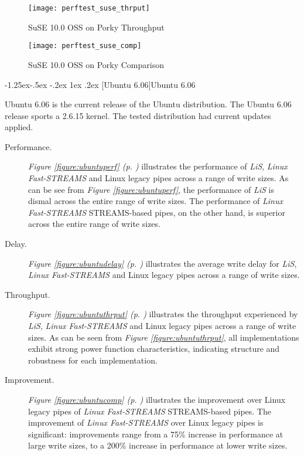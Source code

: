 \documentclass[letterpaper,final,notitlepage,twocolumn,10pt,twoside]{article}
\makeatletter
\let\normalsize\small
\let\small\footnotesize
\let\footnotesize\scriptsize
\let\scriptsize\tiny
\renewcommand\subsubsection{\@startsection{subsubsection}{3}{\z@}%
                                     {-1.25ex\@plus -.5ex \@minus -.2ex}%
                                     {1ex \@plus .2ex}%
                                     {\normalfont\normalsize\bfseries}}
\makeatother
\begin{document}
\begin{figure}[p]
\texttt{[image: perftest\_suse\_thrput]}
\caption[SuSE 10.0 OSS on Porky Throughput]{SuSE 10.0 OSS on Porky Throughput}
\label{figure:susethrput}
\end{figure}

\begin{figure}[p]
\texttt{[image: perftest\_suse\_comp]}
\caption[SuSE 10.0 OSS on Porky Comparison]{SuSE 10.0 OSS on Porky Comparison}
\label{figure:susecomp}
\end{figure}

\subsubsection[Ubuntu 6.06]{Ubuntu 6.06}

Ubuntu 6.06 is the current release of the Ubuntu distribution.  The Ubuntu
6.06 release sports a 2.6.15 kernel.  The tested distribution had current
updates applied.

\begin{description}

\item[Performance.]

\textit{Figure \ref{figure:ubuntuperf} (p. \pageref{figure:ubuntuperf})}
illustrates the performance of \textsl{LiS}, \textsl{Linux Fast-STREAMS} and
Linux legacy pipes across a range of write sizes.  As can be see from
\textit{Figure \ref{figure:ubuntuperf}}, the performance of \textsl{LiS} is
dismal across the entire range of write sizes.  The performance of
\textsl{Linux Fast-STREAMS} STREAMS-based pipes, on the other hand, is
superior across the entire range of write sizes.

\item[Delay.]

\textit{Figure \ref{figure:ubuntudelay} (p. \pageref{figure:ubuntudelay})}
illustrates the average write delay for \textsl{LiS}, \textsl{Linux
Fast-STREAMS} and Linux legacy pipes across a range of write sizes.

\item[Throughput.]

\textit{Figure \ref{figure:ubuntuthrput} (p.  \pageref{figure:ubuntuthrput})}
illustrates the throughput experienced by \textsl{LiS}, \textsl{Linux
Fast-STREAMS} and Linux legacy pipes across a range of write sizes.  As can be
seen from \textit{Figure \ref{figure:ubuntuthrput}}, all implementations
exhibit strong power function characteristics, indicating structure and
robustness for each implementation.

\item[Improvement.]

\textit{Figure \ref{figure:ubuntucomp} (p. \pageref{figure:ubuntucomp})}
illustrates the improvement over Linux legacy pipes of \textsl{Linux
Fast-STREAMS} STREAMS-based pipes.  The improvement of \textsl{Linux
Fast-STREAMS} over Linux legacy pipes is significant: improvements range from
a 75\% increase in performance at large write sizes, to a 200\% increase in
performance at lower write sizes.

\end{description}
\end{document}
